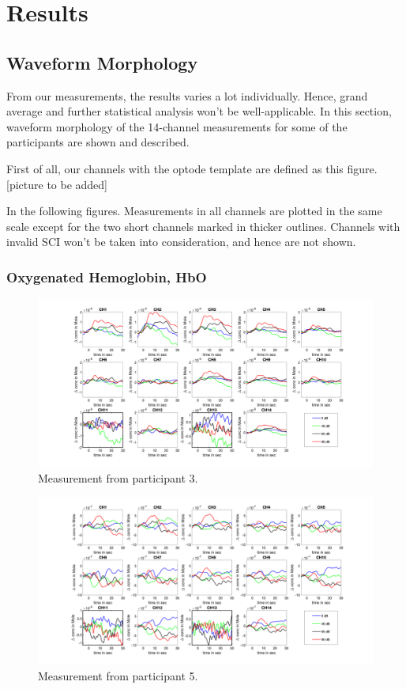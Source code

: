 \chapter{Results}
\section {Waveform Morphology}
From our measurements, the results varies a lot individually. Hence, grand average and further statistical analysis won't be well-applicable. In this section, waveform morphology of the 14-channel measurements for some of the participants are shown and described.

First of all, our channels with the optode template are defined as this figure.
[picture to be added]

In the following figures. Measurements in all channels are plotted in the same scale except for the two short channels marked in thicker outlines. Channels with invalid SCI won't be taken into consideration, and hence are not shown.
\subsection{Oxygenated Hemoglobin, HbO}
\begin{figure}[H]
  \centering
    \includegraphics[scale=.4]{bilder/HbO_Mole/sub_jonas_s_HbO.png}
  \caption{Measurement from participant 3.}
  \label{fig:somesignal}
\end{figure}

\begin{figure}[H]
  \centering
    \includegraphics[scale=.4]{bilder/HbO_Mole/sub_lukas_s_HbO.png}
  \caption{Measurement from participant 5.}
  \label{fig:somesignal}
\end{figure}

